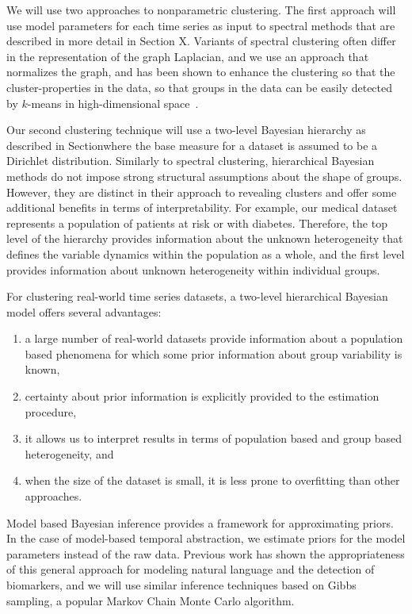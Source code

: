 We will use two approaches to nonparametric clustering.  The first approach will use model parameters for each time series as input to spectral methods that are described in more detail in Section X.  Variants of spectral clustering often differ in the representation of the graph Laplacian, and we use an approach that  normalizes the graph, and has been shown to enhance the clustering so that the cluster-properties in the data, so that groups in the data can be easily detected by $k$-means in high-dimensional space~\cite{Ng01onspectral}.

Our second clustering technique will use a two-level Bayesian hierarchy as described in Sectionwhere the base measure for a dataset is assumed to be a Dirichlet distribution.  Similarly to spectral clustering, hierarchical Bayesian methods do not impose strong structural assumptions about the shape of groups.  However, they are distinct in their approach to revealing clusters and offer some additional benefits in terms of interpretability.  For example, our medical dataset represents a population of patients at risk or with diabetes.  Therefore, the top level of the hierarchy provides information about the unknown heterogeneity that defines the variable dynamics within the population as a whole, and the first level provides information about unknown heterogeneity within individual groups.

For clustering real-world time series datasets, a two-level hierarchical Bayesian model offers several advantages:

\begin{enumerate}
\item a large number of real-world datasets provide information about a population based phenomena for which some prior information about group variability is known,
\item certainty about prior information is explicitly provided to the estimation procedure,
\item it allows us to interpret results in terms of population based and group based heterogeneity, and
\item when the size of the dataset is small, it is less prone to overfitting than other approaches.
\end{enumerate}

Model based Bayesian inference provides a framework for approximating priors.  In the case of model-based temporal abstraction, we estimate priors for the model parameters instead of the raw data.  Previous work has shown the appropriateness of this general approach for modeling natural language and the detection of biomarkers, and we will use similar inference techniques based on Gibbs sampling, a popular Markov Chain Monte Carlo algorithm.





